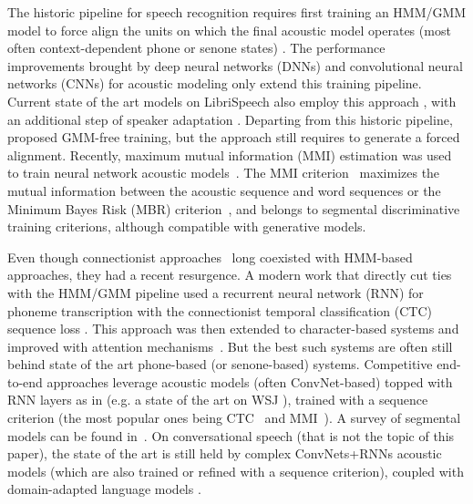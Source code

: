 \documentclass{article}
\begin{document}
The historic pipeline for speech recognition requires first
training an HMM/GMM model to force align the units on which the final
acoustic model operates (most often context-dependent phone or senone
states) \cite{woodland1993htk}. The performance improvements brought
by deep neural networks (DNNs)
\citep{mohamed2012acoustic,hinton2012deep} and convolutional neural
networks (CNNs) \citep{sercu2015very,soltau2014joint} for acoustic
modeling only extend this training pipeline.  Current state
of the art models on LibriSpeech also employ this approach
\citep{panayotov2015librispeech,peddinti2015time}, with an additional
step of speaker adaptation \citep{saon2013speaker,peddinti2015jhu}.
Departing from this historic pipeline,
\cite{senior2014gmm} proposed GMM-free training, but the approach
still requires to generate a forced alignment. Recently, maximum
mutual information (MMI) estimation \citep{bahl1986icassp} was used to
train neural network acoustic models~\citep{povey2016mmi}.
The MMI criterion~\citep{bahl1986icassp}
maximizes the mutual information between the acoustic sequence and
word sequences or the Minimum Bayes Risk (MBR)
criterion~\citep{gibson2006interspeech}, and belongs to segmental
discriminative training criterions, although compatible with
generative models.

Even though connectionist approaches~\citep{lee1995rnn,lecun1995convolutional} 
long coexisted with HMM-based approaches, they had a recent
resurgence. A modern work that
directly cut ties with the HMM/GMM pipeline used a recurrent
neural network (RNN) \citep{graves2013speech} for phoneme transcription
with the connectionist temporal classification (CTC) sequence loss
\citep{graves2006connectionist}. This approach was then extended
to character-based systems \citep{graves2014towards} and improved with
attention
mechanisms~\citep{bahdanau2016attention,chan2016listenattendspell}. But
the best such systems are often still behind state of the art
phone-based (or senone-based) systems. Competitive end-to-end
approaches leverage acoustic models (often ConvNet-based) topped with
RNN layers as in
\citep{hannun2014deep,miao2015eesen,saon2015ibm,amodei2015deep,zhou2018policy,zeyer2018improved}
(e.g. a state of the art on WSJ \citep{chan2015deep}), trained with a
sequence criterion (the most popular ones being
CTC~\citep{graves2006connectionist} and MMI~\citep{bahl1986icassp}).
A survey of segmental models
can be found in~\citep{tang2017segmental}.  On conversational speech
(that is not the topic of this paper), the state of the art is still
held by complex ConvNets+RNNs acoustic models (which are also trained
or refined with a sequence criterion), coupled with domain-adapted
language models
\citep{xiong2017microsoft,saon2017english}.
\end{document}
